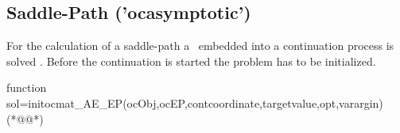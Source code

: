 \subsection{Saddle-Path ('ocasymptotic')}
\label{sec:saddlepathocasymptoticcommand}
For the calculation of a saddle-path a \BVP\ embedded into a continuation process is solved \citep[cf.~][]{grass2012}. Before the continuation is started the problem has to be initialized.
\begin{matlab}
function sol=initocmat_AE_EP(ocObj,ocEP,contcoordinate,targetvalue,opt,varargin)(*@@*)
%
%
%
%
%
%
%

\end{matlab}

